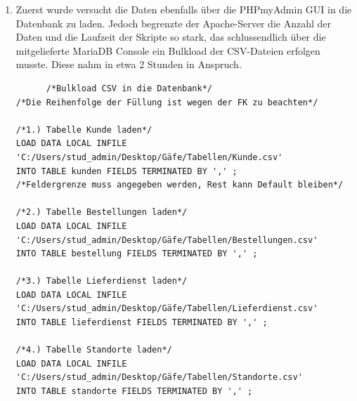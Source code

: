 \documentclass[a4paper, 12pt]{scrartcl}
\begin{document}
\begin{description}
\begin{enumerate}
\begin{verbatim}
/*Tabelle Bestellungen anlegen*/
CREATE TABLE Bestellung (
Bestellnr int Primary Key,
Datum date,
Pos int,
Artnr int,
Artbez varchar(50),
Preis int,
Mwst int,
Menge int,
RabattMenge int,
BetragGesamt int,
RabattKunde int,
MwstGesamt int,
Kunnr int,
Eilauftrag int,
Foreign Key (Kunnr) References Kunden(Kunnr)
)
/*Tabelle Lieferdienst anlegen*/
CREATE TABLE Lieferdienst (
Bestellnr int,
Liefernr int Primary Key ,
Fahrzeugtyp varchar(50),
Unternehmen varchar(50),
DauerDurchschnitt int,
Preis int,
Mwst int,
MaxLieferMenge int,
Sitz varchar(50),
MitarbeiterAnzahl int,
Abholstationen int,
Lieferstart int,
Fahrzeuganzahl int,
FOREIGN KEY (Bestellnr) REFERENCES Bestellung(Bestellnr)
)

/*Tabelle Standorte anlegen*/
CREATE TABLE Standorte (
StandortId int Primary Key,
Liefernr int,
Stadt varchar(50),
Landkz varchar(50),
Land varchar(50),
Bundesland varchar(50),
Region varchar(50),
Leitername varchar(50),
Leitervorname varchar(50),
Mitarbeiteranzahl int,
Fuhrparkgröße int,
Gelaendegroeße int,
FOREIGN KEY (Liefernr ) REFERENCES Lieferdienst(Liefernr )

      \end{verbatim}
      
      \item  Zuerst wurde versucht die Daten ebenfalls über die PHPmyAdmin GUI in die Datenbank zu laden. Jedoch begrenzte der Apache-Server die Anzahl der Daten und die Laufzeit der Skripte so stark, das schlussendlich über die mitgelieferte MariaDB Console ein Bulkload der CSV-Dateien erfolgen musste. Diese nahm in etwa 2 Stunden in Anspruch.
      \begin{verbatim}
      /*Bulkload CSV in die Datenbank*/
/*Die Reihenfolge der Füllung ist wegen der FK zu beachten*/

/*1.) Tabelle Kunde laden*/
LOAD DATA LOCAL INFILE 
'C:/Users/stud_admin/Desktop/Gäfe/Tabellen/Kunde.csv'
INTO TABLE kunden FIELDS TERMINATED BY ',' ; 
/*Feldergrenze muss angegeben werden, Rest kann Default bleiben*/

/*2.) Tabelle Bestellungen laden*/
LOAD DATA LOCAL INFILE 
'C:/Users/stud_admin/Desktop/Gäfe/Tabellen/Bestellungen.csv'
INTO TABLE bestellung FIELDS TERMINATED BY ',' ;

/*3.) Tabelle Lieferdienst laden*/
LOAD DATA LOCAL INFILE 
'C:/Users/stud_admin/Desktop/Gäfe/Tabellen/Lieferdienst.csv'
INTO TABLE lieferdienst FIELDS TERMINATED BY ',' ;

/*4.) Tabelle Standorte laden*/
LOAD DATA LOCAL INFILE 
'C:/Users/stud_admin/Desktop/Gäfe/Tabellen/Standorte.csv'
INTO TABLE standorte FIELDS TERMINATED BY ',' ;
      

\end{verbatim}
\end{enumerate}
\end{description}
\end{document}

